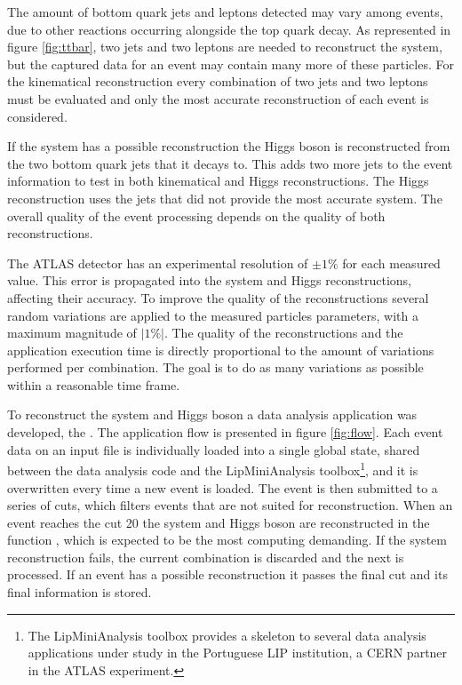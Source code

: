 The amount of bottom quark jets and leptons detected may vary among events, due to other reactions occurring alongside the top quark decay. As represented in figure \ref{fig:ttbar}, two jets and two leptons are needed to reconstruct the \ttbar system, but the captured data for an event may contain many more of these particles. For the kinematical reconstruction every combination of two jets and two leptons must be evaluated and only the most accurate reconstruction of each event is considered.

If the \ttbar system has a possible reconstruction the Higgs boson is reconstructed from the two bottom quark jets that it decays to. This adds two more jets to the event information to test in both kinematical and Higgs reconstructions. The Higgs reconstruction uses the jets that did not provide the most accurate \ttbar system. The overall quality of the event processing depends on the quality of both reconstructions.

The ATLAS detector has an experimental resolution of $\pm1\%$ for each measured value. This error is propagated into the \ttbar system and Higgs reconstructions, affecting their accuracy. To improve the quality of the reconstructions several random variations are applied to the measured particles parameters, with a maximum magnitude of $|1\%|$. The quality of the reconstructions and the application execution time is directly proportional to the amount of variations performed per combination. The goal is to do as many variations as possible within a reasonable time frame.

To reconstruct the \ttbar system and Higgs boson a data analysis application was developed, the \tth. The application flow is presented in figure \ref{fig:flow}. Each event data on an input file is individually loaded into a single global state, shared between the data analysis code and the LipMiniAnalysis toolbox\footnote{The LipMiniAnalysis toolbox provides a skeleton to several data analysis applications under study in the Portuguese LIP institution, a CERN partner in the ATLAS experiment.}, and it is overwritten every time a new event is loaded. The event is then submitted to a series of cuts, which filters events that are not suited for reconstruction. When an event reaches the cut 20 the \ttbar system and Higgs boson are reconstructed in the function \ttDilepKinFit, which is expected to be the most computing demanding. If the \ttbar system reconstruction fails, the current combination is discarded and the next is processed. If an event has a possible reconstruction it passes the final cut and its final information is stored.

